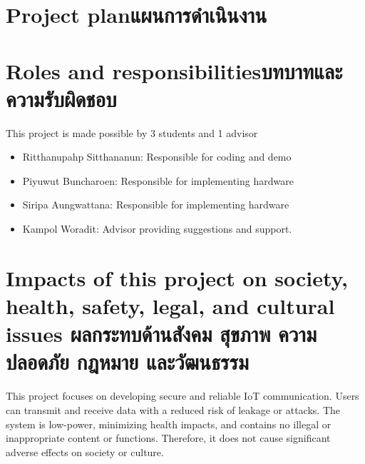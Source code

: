 \section{\ifenglish Project plan\else แผนการดำเนินงาน\fi}


\section{\ifenglish Roles and responsibilities\else บทบาทและความรับผิดชอบ\fi}
This project is made possible by 3 students and 1 advisor
 \begin{itemize} 
            \item Ritthanupahp Sitthananun: Responsible for coding and demo
            \item Piyuwut Buncharoen: Responsible for implementing hardware
            \item Siripa Aungwattana: Responsible for implementing hardware
            \item Kampol Woradit: Advisor providing suggestions and support.
        \end{itemize}

\section{\ifenglish%
Impacts of this project on society, health, safety, legal, and cultural issues
\else%
ผลกระทบด้านสังคม สุขภาพ ความปลอดภัย กฎหมาย และวัฒนธรรม
\fi}
This project focuses on developing secure and reliable IoT communication. Users can transmit and receive data with a reduced risk of leakage or attacks. The system is low-power, minimizing health impacts, and contains no illegal or inappropriate content or functions. Therefore, it does not cause significant adverse effects on society or culture.
